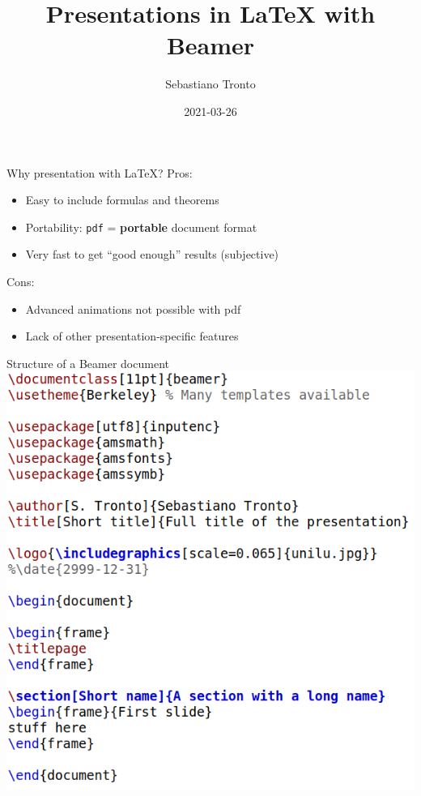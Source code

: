 \documentclass[11pt]{beamer}
\author[\texttt{sebastiano.tronto@uni.lu}]{Sebastiano Tronto}
\title{Presentations in LaTeX with Beamer}
\date{2021-03-26}
\begin{document}
\begin{frame}
  \titlepage
\end{frame}

\begin{frame}{Why presentation with LaTeX?}
  Pros:

  \vspace{0.2cm}
  \begin{itemize}
    \item Easy to include formulas and theorems
    \item Portability: \texttt{pdf} = \textbf{portable} document format
    \item Very fast to get ``good enough'' results (subjective)
  \end{itemize}

  \vspace{0.5cm}
  Cons:

  \vspace{0.2cm}
  \begin{itemize}
    \item Advanced animations not possible with pdf
    \item Lack of other presentation-specific features
  \end{itemize}
\end{frame}

\begin{frame}{Structure of a Beamer document}
  \includegraphics[scale=0.35]{img/beamer.png}
\end{frame}
\end{document}

